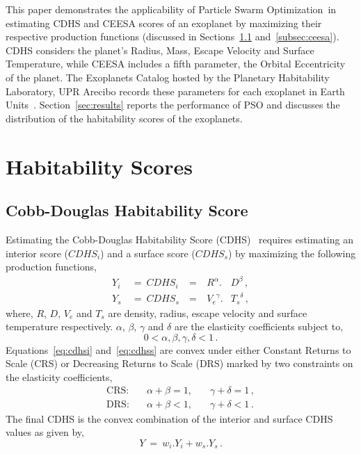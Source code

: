 \documentclass[10pt,draft]{article}
\newcommand{\pso}{Particle Swarm Optimization}
\begin{document}
This paper demonstrates the applicability of \pso\ in estimating CDHS and CEESA scores of an exoplanet by maximizing
their respective production functions (discussed in Sections~\ref{subsec:cdhs} and~\ref{subsec:ceesa}). CDHS considers
the planet's Radius, Mass, Escape Velocity and Surface Temperature, while CEESA includes a fifth parameter, the Orbital
Eccentricity of the planet. The Exoplanets Catalog hosted by the Planetary Habitability Laboratory, UPR Arecibo records
these parameters for each exoplanet in Earth Units~\cite{PHL}. Section~\ref{sec:results} reports the performance of PSO
and discusses the distribution of the habitability scores of the exoplanets.


\section{Habitability Scores}\label{sec:habscore}

\subsection{Cobb-Douglas Habitability Score}\label{subsec:cdhs}
Estimating the Cobb-Douglas Habitability Score (CDHS)~\cite{Bora} requires estimating an interior score \linebreak
($\mathit{CDHS}_i$) and a surface score ($\mathit{CDHS}_s$) by maximizing the following production functions,
\begin{subequations}
  \begin{alignat}{4}
    Y_i\ &=\ {CDHS}_i\ &=&\ R^\alpha.&D^\beta\,,\label{eq:cdhsi}\\
    Y_s\ &=\ {CDHS}_s\ &=&\ {V_e}^\gamma.&{T_s}^\delta\,,\label{eq:cdhss}
  \end{alignat}
\end{subequations}
where, $R$, $D$, $V_e$ and $T_s$ are density, radius, escape velocity and surface temperature respectively. $\alpha$,
$\beta$, $\gamma$ and $\delta$ are the elasticity coefficients subject to,
\begin{equation}
  0 < \alpha,\beta,\gamma,\delta < 1\,.
\end{equation}
Equations~\ref{eq:cdhsi} and~\ref{eq:cdhss} are convex under either Constant Returns to Scale (CRS) or Decreasing
Returns to Scale (DRS) marked by two constraints on the elasticity coefficients,
\begin{subequations}
  \begin{alignat}{3}
    \text{CRS:} & \quad\alpha+\beta = 1,&\quad\gamma+\delta = 1\,,\\
    \text{DRS:} & \quad\alpha+\beta < 1,&\quad\gamma+\delta < 1\,.
  \end{alignat}
\end{subequations}
The final CDHS is the convex combination of the interior and surface CDHS values as given by,
\begin{equation}
  Y\ =\ w_i.Y_i + w_s.Y_s\,.
\end{equation}
\end{document}
